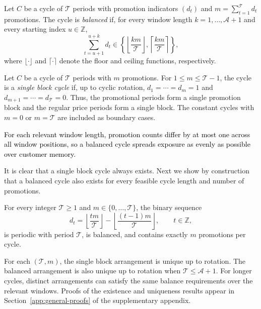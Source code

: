 \begin{definition}
    \label{def:balanced-cycle}
    Let \(C\) be a cycle of \(\mathcal T\) periods with promotion indicators \((d_t)\) and \(m=\sum_{t=1}^{\mathcal T}d_t\) promotions. The cycle is \emph{balanced} if, for every window length \(k=1,\ldots,\mathcal A+1\) and every starting index \(u\in\mathbb Z\),
    \[
        \sum_{t=u+1}^{u+k}d_t
        \in
        \left\{
            \left\lfloor\frac{km}{\mathcal T}\right\rfloor,
            \left\lceil\frac{km}{\mathcal T}\right\rceil
        \right\},
    \]
    where \(\lfloor \cdot \rfloor\) and \(\lceil \cdot \rceil\) denote the floor and ceiling functions, respectively.
\end{definition}

\begin{definition}
    \label{def:single-transition-cycle}
    Let \(C\) be a cycle of \(\mathcal T\) periods with \(m\) promotions. For \(1\le m\le \mathcal T-1\), the cycle is a \emph{single block cycle} if, up to cyclic rotation, \(d_1=\cdots=d_m=1\) and \(d_{m+1}=\cdots=d_{\mathcal T}=0\). Thus, the promotional periods form a single promotion block and the regular price periods form a single block. The constant cycles with \(m=0\) or \(m=\mathcal T\) are included as boundary cases.
\end{definition}

\textcolor{black}{For each relevant window length, promotion counts differ by at most one across all window positions, so a balanced cycle spreads exposure as evenly as possible over customer memory.}

It is clear that a single block cycle always exists. Next we show by construction that a balanced cycle also exists for every feasible cycle length and number of promotions.

\begin{lemma}
    \label{lem:balanced-exists}
    For every integer \(\mathcal T\ge1\) and \(m\in\{0,\ldots,\mathcal T\}\), the binary sequence
    \[
        d_t=\left\lfloor\frac{tm}{\mathcal T}\right\rfloor
            -\left\lfloor\frac{(t-1)m}{\mathcal T}\right\rfloor,
        \qquad t\in\mathbb Z,
    \]
    is periodic with period \(\mathcal T\), is balanced, and contains exactly \(m\) promotions per cycle.
\end{lemma}

For each \((\mathcal T,m)\), the single block arrangement is unique up to rotation. The balanced arrangement is also unique up to rotation when \(\mathcal T\le\mathcal A+1\). For longer cycles, distinct arrangements can satisfy the same balance requirements over the relevant windows. Proofs of the existence and uniqueness results appear in Section~\ref{app:general-proofs} of the supplementary appendix.

